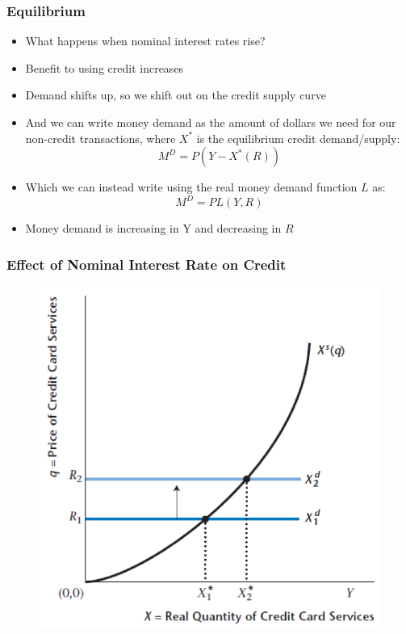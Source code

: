 \documentclass{beamer}
\begin{document}
\begin{frame}
\frametitle[alignment=center]{Equilibrium}
\begin{itemize}
\item What happens when nominal interest rates rise?
\bigskip
\item Benefit to using credit increases
\bigskip
\item Demand shifts up, so we shift out on the credit supply curve
\bigskip
\item And we can write money demand as the amount of dollars we need for our non-credit transactions, where $X^*$ is the equilibrium credit demand/supply:
$$M^D=P(Y-X^*(R))$$
\item Which we can instead write using the real money demand function $L$ as:
$$M^D=PL(Y,R)$$
\item Money demand is increasing in Y and decreasing in $R$
\end{itemize}

\end{frame}
\begin{frame}
\frametitle[alignment=center]{Effect of Nominal Interest Rate on Credit}
\begin{figure}
\centering
\includegraphics[scale=0.65]{Figures/W_Fig_12pt5.png}
\end{figure}
\end{frame}
\end{document}
